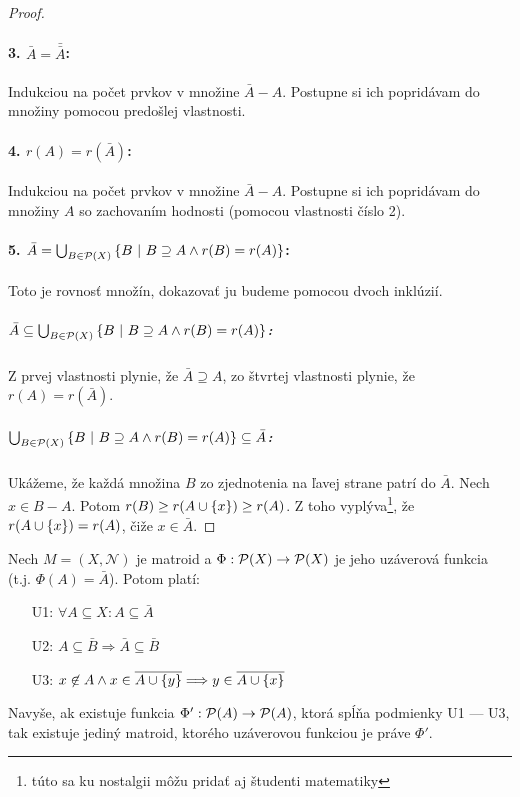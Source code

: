 \begin{toreview}
\begin{proof}
\paragraph{3. $\bar{A} = \bar{\bar{A}}$:} Indukciou na počet prvkov v množine $\bar{A} - A$.
Postupne si ich popridávam do množiny pomocou predošlej vlastnosti.
\paragraph{4. $r(A) = r(\bar{A})$:} Indukciou na počet prvkov v množine  $\bar{A} - A$.
Postupne si ich popridávam do množiny $A$ so zachovaním hodnosti (pomocou vlastnosti číslo 2).
\paragraph{5. $\bar{A} = \bigcup_{B \in \mathcal{P}(X)} \left\{B ~|~ B \supseteq A \wedge r(B) = r(A)\right\}$:}
Toto je rovnosť množín, dokazovať ju budeme pomocou dvoch inklúzií.
\subparagraph{$\bar{A} \subseteq \bigcup_{B \in \mathcal{P}(X)} \left\{B ~|~ B \supseteq A \wedge r(B) = r(A)\right\}$:} Z prvej vlastnosti plynie, že $\bar{A} \supseteq A$, zo štvrtej vlastnosti plynie, že $r(A) = r(\bar{A})$.
\subparagraph{$\bigcup_{B \in \mathcal{P}(X)} \left\{B ~|~ B \supseteq A \wedge r(B) = r(A)\right\} \subseteq \bar{A}$:}
Ukážeme, že každá množina $B$ zo zjednotenia na ľavej strane patrí do $\bar{A}$.
Nech $x \in B - A$.
Potom $r(B) \geq r(A \cup \left\{x\right\}) \geq r(A)$.
Z toho vyplýva\footnote{túto sa ku nostalgii môžu pridať aj študenti matematiky}, že $r(A \cup \left\{x\right\}) = r(A)$, čiže $x \in \bar{A}$.
\end{proof}
\end{toreview}

\begin{theorem}
Nech $M = (X, \mathcal{N})$ je matroid a $\Phi:\mathcal{P}(X) \to \mathcal{P}(X)$ je jeho uzáverová funkcia (t.j. $\Phi(A) = \bar{A}$).
Potom platí:
\begin{enumerate}
    \item[U1:] $\forall A \subseteq X: A \subseteq \bar{A}$
    \item[U2:] $A \subseteq \bar{B} \Longrightarrow \bar{A} \subseteq \bar{B}$
    \item[U3:] $x \not\in A \wedge x \in \overline{A \cup \left\{y\right\}} \Longrightarrow y \in \overline{A \cup \left\{x\right\}}$
\end{enumerate}

Navyše, ak existuje funkcia $\Phi': \mathcal{P}(A) \to \mathcal{P}(A)$, ktorá spĺňa podmienky U1 --- U3, tak existuje jediný matroid,
ktorého uzáverovou funkciou je práve $\Phi'$.
\end{theorem}

